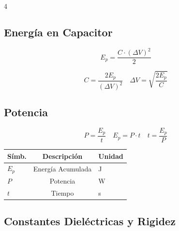 \documentclass[9pt, landscape, letterpaper]{extarticle}
\begin{document}
\begin{multicols}{4}
  \subsection{Energía en Capacitor}

  \begin{formulabox}
    $$E_p = \frac{C \cdot (\Delta V)^2}{2}$$
  \end{formulabox}

  \begin{despejesbox}[Despejes]
    $$C = \frac{2 E_p}{(\Delta V)^2} \quad \Delta V = \sqrt{\frac{2 E_p}{C}}$$
  \end{despejesbox}

  \subsection{Potencia}

  \begin{formulabox}
    $$P = \frac{E_p}{t} \quad E_p = P \cdot t \quad t = \frac{E_p}{P}$$
  \end{formulabox}

  \begin{tablabox}[Variables]
    \tablacompacta
    \begin{tabular}{@{}lcl@{}}
      \toprule
      Símb. & Descripción       & Unidad \\
      \midrule
      $E_p$ & Energía Acumulada & J      \\
      $P$   & Potencia          & W      \\
      $t$   & Tiempo            & s      \\
      \bottomrule
    \end{tabular}
  \end{tablabox}
  \subsection{Constantes Dieléctricas y Rigidez}


\end{multicols}
\end{document}
